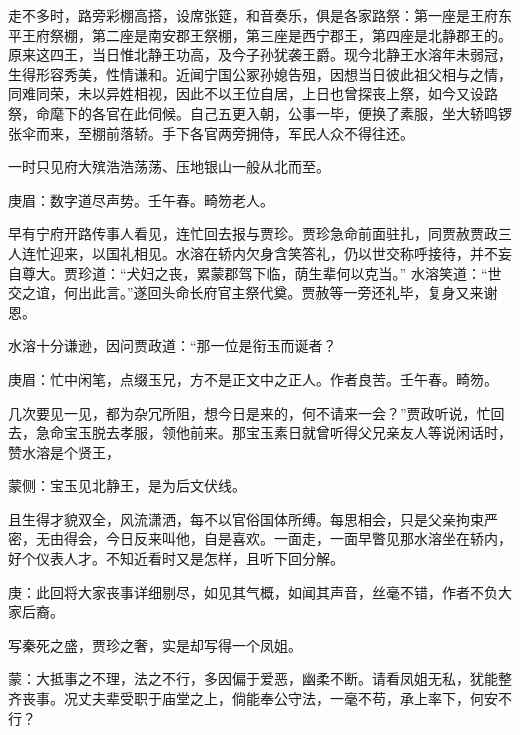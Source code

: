 \begin{parag}
    走不多时，路旁彩棚高搭，设席张筵，和音奏乐，俱是各家路祭：第一座是王府东平王府祭棚，第二座是南安郡王祭棚，第三座是西宁郡王，第四座是北静郡王的。原来这四王，当日惟北静王功高，及今子孙犹袭王爵。现今北静王水溶年未弱冠，生得形容秀美，性情谦和。近闻宁国公冢孙媳告殂，因想当日彼此祖父相与之情，同难同荣，未以异姓相视，因此不以王位自居，上日也曾探丧上祭，如今又设路祭，命麾下的各官在此伺候。自己五更入朝，公事一毕，便换了素服，坐大轿鸣锣张伞而来，至棚前落轿。手下各官两旁拥侍，军民人众不得往还。
\end{parag}


\begin{parag}
    一时只见府大殡浩浩荡荡、压地银山一般从北而至。\begin{note}庚眉：数字道尽声势。壬午春。畸笏老人。\end{note}早有宁府开路传事人看见，连忙回去报与贾珍。贾珍急命前面驻扎，同贾赦贾政三人连忙迎来，以国礼相见。水溶在轿内欠身含笑答礼，仍以世交称呼接待，并不妄自尊大。贾珍道：“犬妇之丧，累蒙郡驾下临，荫生辈何以克当。” 水溶笑道：“世交之谊，何出此言。”遂回头命长府官主祭代奠。贾赦等一旁还礼毕，复身又来谢恩。
\end{parag}


\begin{parag}
    水溶十分谦逊，因问贾政道：“那一位是衔玉而诞者？\begin{note}庚眉：忙中闲笔，点缀玉兄，方不是正文中之正人。作者良苦。壬午春。畸笏。\end{note}几次要见一见，都为杂冗所阻，想今日是来的，何不请来一会？”贾政听说，忙回去，急命宝玉脱去孝服，领他前来。那宝玉素日就曾听得父兄亲友人等说闲话时，赞水溶是个贤王，\begin{note}蒙侧：宝玉见北静王，是为后文伏线。\end{note}且生得才貌双全，风流潇洒，每不以官俗国体所缚。每思相会，只是父亲拘束严密，无由得会，今日反来叫他，自是喜欢。一面走，一面早瞥见那水溶坐在轿内，好个仪表人才。不知近看时又是怎样，且听下回分解。
\end{parag}


\begin{parag}
    \begin{note}庚：此回将大家丧事详细剔尽，如见其气概，如闻其声音，丝毫不错，作者不负大家后裔。\end{note}
\end{parag}


\begin{parag}
    \begin{note}写秦死之盛，贾珍之奢，实是却写得一个凤姐。\end{note}
\end{parag}


\begin{parag}
    \begin{note}蒙：大抵事之不理，法之不行，多因偏于爱恶，幽柔不断。请看凤姐无私，犹能整齐丧事。况丈夫辈受职于庙堂之上，倘能奉公守法，一毫不苟，承上率下，何安不行？\end{note}
\end{parag}